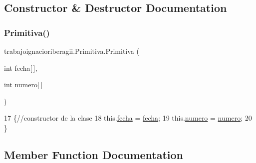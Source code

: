 \subsection{Constructor \& Destructor Documentation}
\mbox{\label{classtrabajoignacioriberagii_1_1_primitiva_a9320d03673870456e51eedf94aa1f2d2}} 
\subsubsection{\texorpdfstring{Primitiva()}{Primitiva()}}
{\footnotesize\ttfamily trabajoignacioriberagii.\+Primitiva.\+Primitiva (\begin{DoxyParamCaption}\item[{int}]{fecha\mbox{[}$\,$\mbox{]},  }\item[{int}]{numero\mbox{[}$\,$\mbox{]} }\end{DoxyParamCaption})\hspace{0.3cm}{\ttfamily [inline]}}


\begin{DoxyCode}
17                                                  \{\textcolor{comment}{//constructor de la clase}
18         this.\mbox{\hyperlink{classtrabajoignacioriberagii_1_1_primitiva_aed579bc382e7b2690693c47175ee5ba7}{fecha}} = \mbox{\hyperlink{classtrabajoignacioriberagii_1_1_primitiva_aed579bc382e7b2690693c47175ee5ba7}{fecha}};
19         this.\mbox{\hyperlink{classtrabajoignacioriberagii_1_1_primitiva_a950834ca537595189c226c313d28341b}{numero}} = \mbox{\hyperlink{classtrabajoignacioriberagii_1_1_primitiva_a950834ca537595189c226c313d28341b}{numero}};
20     \}
\end{DoxyCode}


\subsection{Member Function Documentation}
\mbox{\label{classtrabajoignacioriberagii_1_1_primitiva_a7be163e2f1b97cbf54236653c7a95cd8}} 
